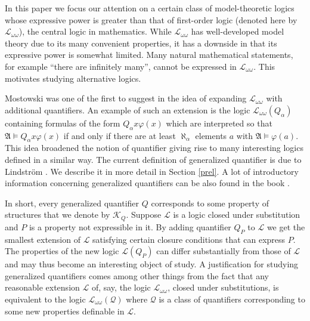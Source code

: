 \documentclass{ndjflart}
\theoremstyle{plain}
\theoremstyle{definition}
\numberwithin{equation}{section}
\begin{document}
In this paper we focus our attention on a certain class of model-theoretic logics whose expressive power is greater than that of first-order logic (denoted here by $\mathcal{L}_{\omega\omega}$), the central logic in mathematics.
While $\mathcal{L}_{\omega\omega}$ has well-developed model theory due to its many convenient properties, it has a downside in that its expressive power is somewhat limited.
Many natural mathematical statements, for example ``there are infinitely many'', cannot be expressed in $\mathcal{L}_{\omega\omega}$.
This motivates studying alternative logics.

Mostowski was one of the first to suggest in \cite{Mostowski:1957}
the idea of expanding $\mathcal{L}_{\omega\omega}$ with additional quantifiers.
An example of such an extension is the logic $\mathcal{L}_{\omega\omega}(Q_{\alpha})$ containing formulas of the form $Q_{\alpha} x \varphi(x)$ which are interpreted so that $\mathfrak{A} \vDash  Q_{\alpha} x \varphi(x)$ if and only if there are at least $\aleph_{\alpha}$ elements $a$ with $\mathfrak{A} \vDash \varphi(a)$.
This idea broadened the notion of quantifier giving rise to many interesting logics defined in a similar way.
The current definition of generalized quantifier is due to Lindstr\"om \cite{Lindstrom:1966}. We describe it in more detail in Section \ref{prel}.
A lot of introductory information concerning generalized quantifiers can be also found in the book \cite{Ebbinghaus:1985}.

In short, every generalized quantifier $Q$ corresponds to some property of structures that we denote by $\mathcal{K}_Q$.
Suppose $\mathcal{L}$ is a logic closed under substitution and $P$ is a property not expressible in it. By adding quantifier $Q_P$ to $\mathcal{L}$ we get the smallest extension of $\mathcal{L}$ satisfying certain closure conditions that can express $P$.
The properties of the new logic $\mathcal{L}(Q_P)$ can differ substantially from those of $\mathcal{L}$ and may thus become an interesting object of study.
A justification for studying generalized quantifiers comes among other things from the fact that any reasonable extension $\mathcal{L}$ of, say, the logic $\mathcal{L}_{\omega\omega}$,
closed under substitutions, is equivalent to the logic $\mathcal{L}_{\omega\omega}(\mathcal{Q})$ where $\mathcal{Q}$ is a class of quantifiers corresponding to some new properties definable in $\mathcal{L}$.
\end{document}
